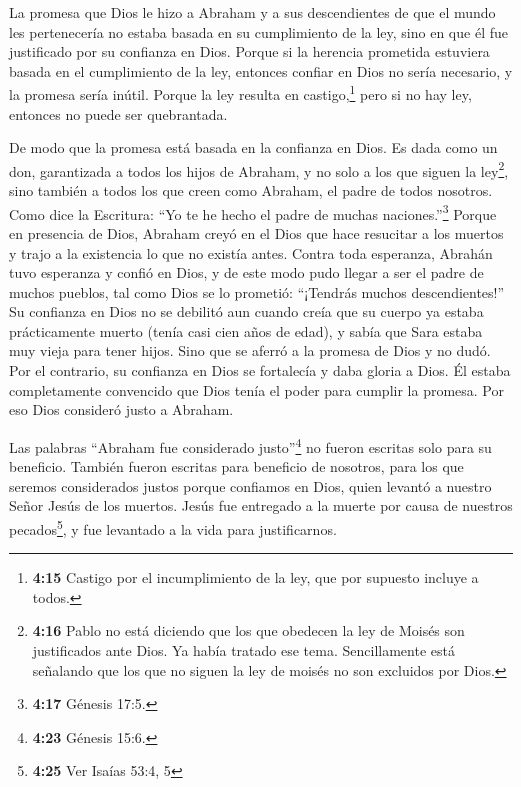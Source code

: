  La promesa que Dios le hizo a Abraham y a sus
descendientes de que el mundo les pertenecería no estaba basada en su
cumplimiento de la ley, sino en que él fue justificado por su confianza
en Dios.  Porque si la herencia prometida estuviera basada
en el cumplimiento de la ley, entonces confiar en Dios no sería
necesario, y la promesa sería inútil.  Porque la ley
resulta en castigo,\footnote{\textbf{4:15} Castigo por el incumplimiento
  de la ley, que por supuesto incluye a todos.} pero si no hay ley,
entonces no puede ser quebrantada.

 De modo que la promesa está basada en la confianza en
Dios. Es dada como un don, garantizada a todos los hijos de Abraham, y
no solo a los que siguen la ley\footnote{\textbf{4:16} Pablo no está
  diciendo que los que obedecen la ley de Moisés son justificados ante
  Dios. Ya había tratado ese tema. Sencillamente está señalando que los
  que no siguen la ley de moisés no son excluidos por Dios.}, sino
también a todos los que creen como Abraham, el padre de todos nosotros.
 Como dice la Escritura: ``Yo te he hecho el padre de
muchas naciones.''\footnote{\textbf{4:17} Génesis 17:5.} Porque en
presencia de Dios, Abraham creyó en el Dios que hace resucitar a los
muertos y trajo a la existencia lo que no existía antes. 
Contra toda esperanza, Abrahán tuvo esperanza y confió en Dios, y de
este modo pudo llegar a ser el padre de muchos pueblos, tal como Dios se
lo prometió: ``¡Tendrás muchos descendientes!''  Su
confianza en Dios no se debilitó aun cuando creía que su cuerpo ya
estaba prácticamente muerto (tenía casi cien años de edad), y sabía que
Sara estaba muy vieja para tener hijos.  Sino que se aferró
a la promesa de Dios y no dudó. Por el contrario, su confianza en Dios
se fortalecía y daba gloria a Dios.  Él estaba
completamente convencido que Dios tenía el poder para cumplir la
promesa.  Por eso Dios consideró justo a Abraham.

 Las palabras ``Abraham fue considerado justo''\footnote{\textbf{4:23}
  Génesis 15:6.} no fueron escritas solo para su beneficio.
 También fueron escritas para beneficio de nosotros, para
los que seremos considerados justos porque confiamos en Dios, quien
levantó a nuestro Señor Jesús de los muertos.  Jesús fue
entregado a la muerte por causa de nuestros pecados\footnote{\textbf{4:25}
  Ver Isaías 53:4, 5}, y fue levantado a la vida para justificarnos.

